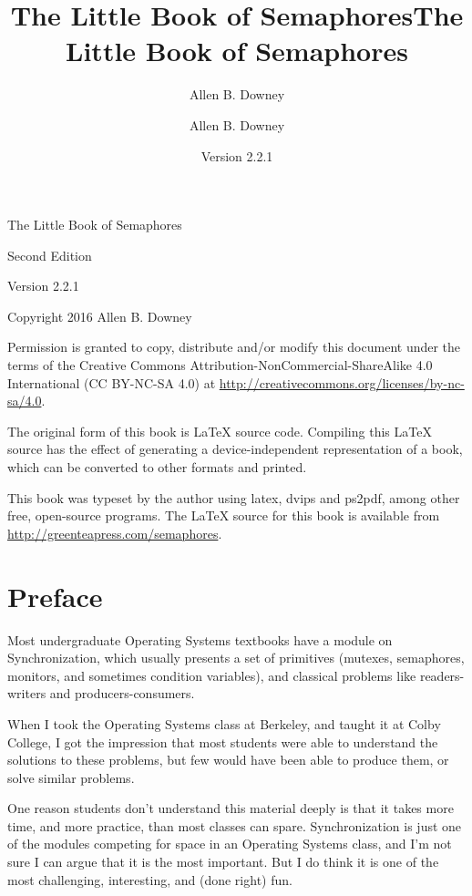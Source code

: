 \documentclass{book}
\title{The Little Book of Semaphores}
\author{Allen B. Downey}
\newcommand{\theversion}{Version 2.2.1}
\begin{document}
\title {The Little Book of Semaphores}
\author {Allen B. Downey}

\date {\theversion}
\maketitle

\vspace{2in}
\begin{center}
{\Large The Little Book of Semaphores}

Second Edition
\vspace{0.25in}

\theversion
\vspace{0.25in}

Copyright 2016 Allen B. Downey
\end{center}
\vspace{0.25in}

Permission is granted to copy, distribute and/or modify this
document under the terms of the Creative Commons
Attribution-NonCommercial-ShareAlike 4.0 International (CC BY-NC-SA 4.0)
at \url{http://creativecommons.org/licenses/by-nc-sa/4.0}.

The original form of this book is LaTeX source code.
Compiling this LaTeX source has the effect of generating
a device-independent representation of a book, which
can be converted to other formats and printed.

This book was typeset by the author using latex, dvips and ps2pdf,
among other free, open-source programs.
The LaTeX source for this book is available from
\url{http://greenteapress.com/semaphores}.

\frontmatter

\chapter{Preface}

Most undergraduate Operating Systems textbooks have a module on
Synchronization, which usually presents a set of primitives
(mutexes, semaphores, monitors, and sometimes condition variables),
and classical problems like readers-writers and
producers-consumers.

When I took the Operating Systems class at Berkeley, and taught it at
Colby College, I got the impression that most students were able to
understand the solutions to these problems, but few would have been
able to produce them, or solve similar problems.

One reason students don't understand this material deeply is that
it takes more time, and more practice, than most classes can spare.
Synchronization is just one of the modules competing for space in
an Operating Systems class, and I'm not sure I can argue that it is
the most important.  But I do think it is one of the most challenging,
interesting, and (done right) fun.
\end{document}
